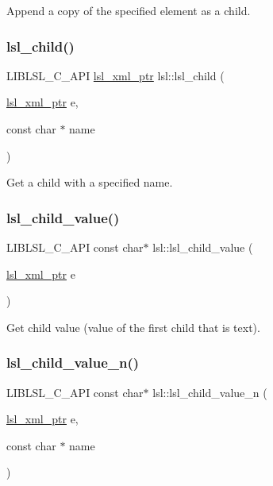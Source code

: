 Append a copy of the specified element as a child. \mbox{\label{namespacelsl_a023258f274202055146894d26e3cf2ad}} 
\subsubsection{\texorpdfstring{lsl\+\_\+child()}{lsl\_child()}}
{\footnotesize\ttfamily L\+I\+B\+L\+S\+L\+\_\+\+C\+\_\+\+A\+PI \hyperlink{namespacelsl_a5edc7a49a1a1be1634fe6dce3d59c59b}{lsl\+\_\+xml\+\_\+ptr} lsl\+::lsl\+\_\+child (\begin{DoxyParamCaption}\item[{\hyperlink{namespacelsl_a5edc7a49a1a1be1634fe6dce3d59c59b}{lsl\+\_\+xml\+\_\+ptr}}]{e,  }\item[{const char $\ast$}]{name }\end{DoxyParamCaption})}

Get a child with a specified name. \mbox{\label{namespacelsl_aa6a774c3c6e431610a98be1b83bc8a3b}} 
\subsubsection{\texorpdfstring{lsl\+\_\+child\+\_\+value()}{lsl\_child\_value()}}
{\footnotesize\ttfamily L\+I\+B\+L\+S\+L\+\_\+\+C\+\_\+\+A\+PI const char$\ast$ lsl\+::lsl\+\_\+child\+\_\+value (\begin{DoxyParamCaption}\item[{\hyperlink{namespacelsl_a5edc7a49a1a1be1634fe6dce3d59c59b}{lsl\+\_\+xml\+\_\+ptr}}]{e }\end{DoxyParamCaption})}

Get child value (value of the first child that is text). \mbox{\label{namespacelsl_ac70e2fc6f64715cead7b4b8e776cc6e7}} 
\subsubsection{\texorpdfstring{lsl\+\_\+child\+\_\+value\+\_\+n()}{lsl\_child\_value\_n()}}
{\footnotesize\ttfamily L\+I\+B\+L\+S\+L\+\_\+\+C\+\_\+\+A\+PI const char$\ast$ lsl\+::lsl\+\_\+child\+\_\+value\+\_\+n (\begin{DoxyParamCaption}\item[{\hyperlink{namespacelsl_a5edc7a49a1a1be1634fe6dce3d59c59b}{lsl\+\_\+xml\+\_\+ptr}}]{e,  }\item[{const char $\ast$}]{name }\end{DoxyParamCaption})}

